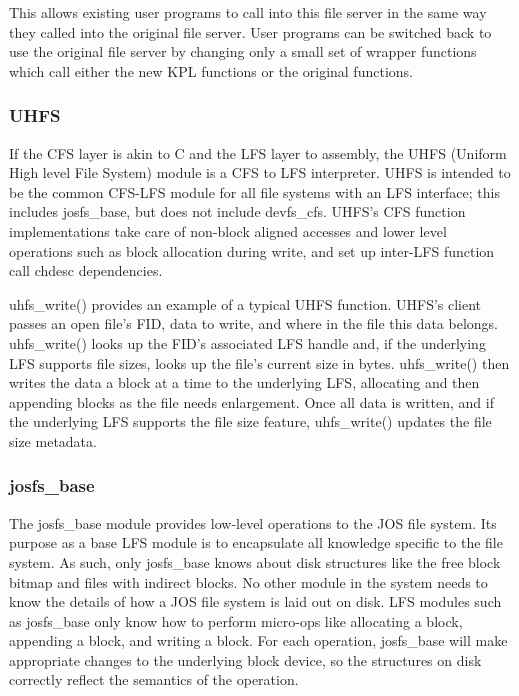 This allows existing user programs to call into this file server in the same way
they called into the original file server. User programs can be switched back to
use the original file server by changing only a small set of wrapper functions
which call either the new KPL functions or the original functions.

\subsubsection{UHFS}
\label{sec:solution:impl:uhfs}

If the CFS layer is akin to C and the LFS layer to assembly, the UHFS (Uniform
High level File System) module is a CFS to LFS interpreter. UHFS is intended to
be the common CFS-LFS module for all file systems with an LFS interface; this
includes josfs\_base, but does not include devfs\_cfs. UHFS's CFS function
implementations take care of non-block aligned accesses and lower level
operations such as block allocation during write, and set up inter-LFS function
call chdesc dependencies.

uhfs\_write() provides an example of a typical UHFS function. UHFS's client
passes an open file's FID, data to write, and where in the file this data
belongs. uhfs\_write() looks up the FID's associated LFS handle and, if the
underlying LFS supports file sizes, looks up the file's current size in bytes.
uhfs\_write() then writes the data a block at a time to the underlying LFS,
allocating and then appending blocks as the file needs enlargement. Once all
data is written, and if the underlying LFS supports the file size feature,
uhfs\_write() updates the file size metadata.

\subsubsection{josfs\_base}
\label{sec:solution:impl:base}

The josfs\_base module provides low-level operations to the JOS file system.
Its purpose as a base LFS module is to encapsulate all knowledge specific to the
file system. As such, only josfs\_base knows about disk structures like the free
block bitmap and files with indirect blocks. No other module in the system needs
to know the details of how a JOS file system is laid out on disk. LFS modules
such as josfs\_base only know how to perform micro-ops like allocating a block,
appending a block, and writing a block. For each operation, josfs\_base will
make appropriate changes to the underlying block device, so the structures on
disk correctly reflect the semantics of the operation.

